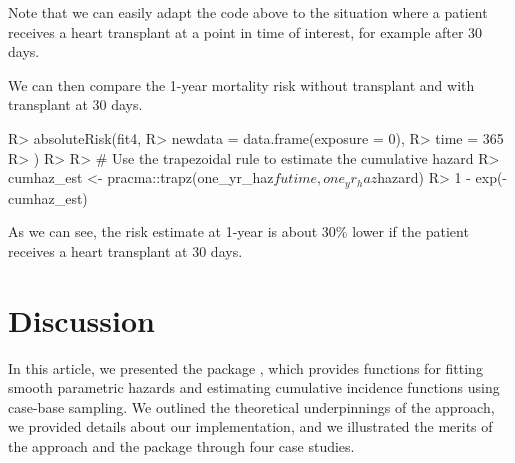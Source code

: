 \documentclass[
]{jss}
\begin{document}
Note that we can easily adapt the code above to the situation where a
patient receives a heart transplant at a point in time of interest, for
example after 30 days.

\begin{CodeChunk}

\end{CodeChunk}

We can then compare the 1-year mortality risk without transplant and
with transplant at 30 days.

\begin{CodeChunk}

\begin{CodeInput}
R> absoluteRisk(fit4,
R>   newdata = data.frame(exposure = 0),
R>   time = 365
R> )
R> 
R> # Use the trapezoidal rule to estimate the cumulative hazard
R> cumhaz_est <- pracma::trapz(one_yr_haz$futime, one_yr_haz$hazard)
R> 1 - exp(-cumhaz_est)
\end{CodeInput}
\end{CodeChunk}

As we can see, the risk estimate at 1-year is about 30\% lower if the
patient receives a heart transplant at 30 days.

\hypertarget{discussion}{%
\section{Discussion}\label{discussion}}

In this article, we presented the  package ,
which provides functions for fitting smooth parametric hazards and
estimating cumulative incidence functions using case-base sampling. We
outlined the theoretical underpinnings of the approach, we provided
details about our implementation, and we illustrated the merits of the
approach and the package through four case studies.
\end{document}
